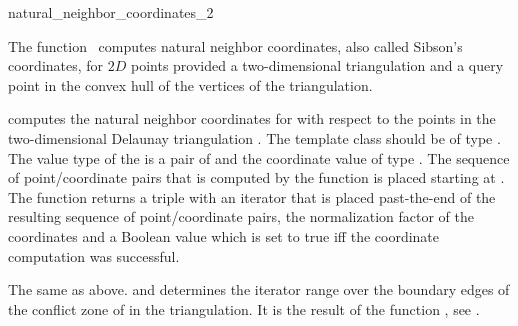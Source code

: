 
\begin{ccRefFunction}{natural_neighbor_coordinates_2}

\ccDefinition
  
The function \ccRefName\ computes natural neighbor coordinates, also
called Sibson's coordinates, for $2D$ points provided a two-dimensional
triangulation and a query point in the convex hull of the vertices
of the triangulation.



 { computes the
  natural neighbor coordinates for  with respect to the points
  in the two-dimensional Delaunay triangulation .  The
  template class  should be of type
  .  The value type of the
   is a pair of  and the
  coordinate value of type . The sequence of
  point/coordinate pairs that is computed by the function is placed
  starting at . The function returns a triple with an
  iterator that is placed past-the-end of the resulting sequence of
  point/coordinate pairs, the normalization factor of the coordinates
  and a Boolean value which is set to true iff the coordinate
  computation was successful.  }

 { The same as above.
   and  determines the iterator range
  over the boundary edges of the conflict zone of  in the
  triangulation. It is the result of the function
  , see .}


\end{ccRefFunction}
